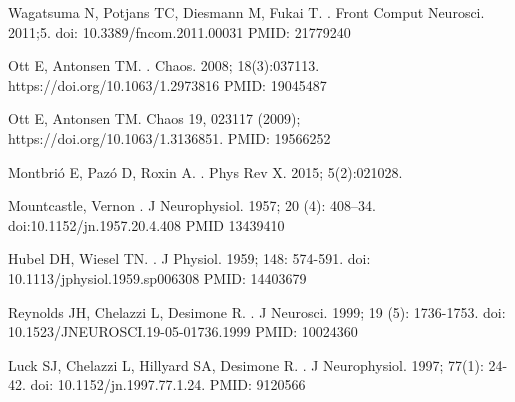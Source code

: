\documentclass[10pt,letterpaper]{article}
\begin{document}
%
%
% 
\begin{thebibliography}{10}

Wagatsuma N, Potjans TC, Diesmann M, Fukai T.
.
\newblock Front Comput Neurosci. 2011;5. doi: 10.3389/fncom.2011.00031 PMID: 21779240

Ott E, Antonsen TM.
.
\newblock Chaos. 2008; 18(3):037113. https://doi.org/10.1063/1.2973816 PMID: 19045487

Ott E, Antonsen TM.
\newblock Chaos 19, 023117 (2009); https://doi.org/10.1063/1.3136851. PMID: 19566252

Montbrió E, Pazó D, Roxin A.
.
\newblock Phys Rev X. 2015; 5(2):021028.

Mountcastle, Vernon
.
\newblock J Neurophysiol. 1957; 20 (4): 408–34. doi:10.1152/jn.1957.20.4.408 PMID 13439410

Hubel DH, Wiesel TN.
.
\newblock J Physiol. 1959; 148: 574-591. doi: 10.1113/jphysiol.1959.sp006308 PMID: 14403679

Reynolds JH, Chelazzi L, Desimone R.
.
\newblock J Neurosci. 1999; 19 (5): 1736-1753. doi: 10.1523/JNEUROSCI.19-05-01736.1999 PMID: 10024360

Luck SJ, Chelazzi L, Hillyard SA, Desimone R.
.
\newblock J Neurophysiol. 1997; 77(1): 24-42. doi: 10.1152/jn.1997.77.1.24. PMID: 9120566


\end{thebibliography}
\end{document}
